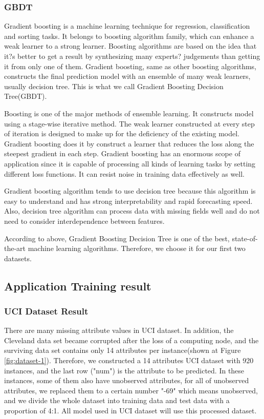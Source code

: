 \documentclass[letterpaper]{article} %
\begin{document}
\subsubsection{GBDT}

Gradient boosting is a machine learning technique for regression, classification and sorting tasks. It belongs to boosting algorithm family, which can enhance a weak learner to a strong learner. Boosting algorithms are based on the idea that it?s better to get a result by synthesizing many experts? judgements than getting it from only one of them. Gradient boosting, same as other boosting algorithms, constructs the final prediction model with an ensemble of many weak learners, usually decision tree. This is what we call Gradient Boosting Decision Tree(GBDT).

Boosting is one of the major methods of ensemble learning. It constructs model using a stage-wise iterative method. The weak learner constructed at every step of iteration is designed to make up for the deficiency of the existing model. Gradient boosting does it by construct a learner that reduces the loss along the steepest gradient in each step. Gradient boosting has an enormous scope of application since it is capable of processing all kinds of learning tasks by setting different loss functions. It can resist noise in training data effectively as well.

Gradient boosting algorithm tends to use decision tree because this algorithm is easy to understand and has strong interpretability and rapid forecasting speed. Also, decision tree algorithm can process data with missing fields well and do not need to consider interdependence between features.

According to above, Gradient Boosting Decision Tree is one of the best, state-of-the-art machine learning algorithms. Therefore, we choose it for our first two datasets.

\subsection{Application Training result}

\subsubsection{UCI Dataset Result}

There are many missing attribute values in UCI dataset. In addition, the Cleveland data set became corrupted after the loss of a computing node, and the surviving data set contains only 14 attributes per instance(shown at Figure \ref{fig:dataset-1}). Therefore, we constructed a 14 attributes UCI dataset with 920 instances, and the last row ("num") is the attribute to be predicted. In these instances, some of them also have unobserved attributes, for all of unobserved attributes, we replaced them to a certain number "-69" which means unobserved, and we divide the whole dataset into training data and test data with a proportion of 4:1. All model used in UCI dataset will use this processed dataset.
\end{document}
